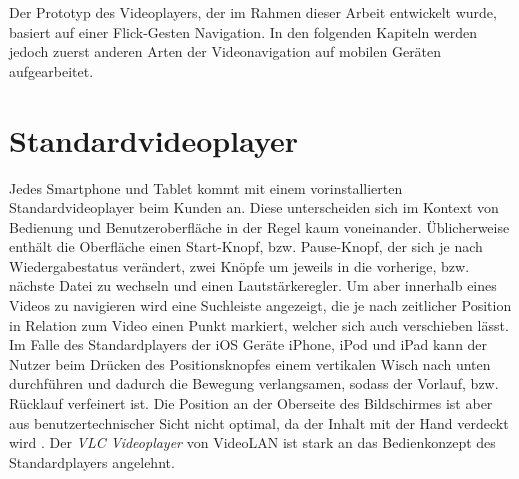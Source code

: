 \documentclass[11pt,a4paper]{report}
\begin{document}
Der Prototyp des Videoplayers, der im Rahmen dieser Arbeit entwickelt wurde, basiert auf einer Flick-Gesten Navigation. In den folgenden Kapiteln werden jedoch zuerst anderen Arten der Videonavigation auf mobilen Geräten aufgearbeitet.

\section{Standardvideoplayer}

Jedes Smartphone und Tablet kommt mit einem vorinstallierten Standardvideoplayer beim Kunden an. Diese unterscheiden sich im Kontext von Bedienung und Benutzeroberfläche in der Regel kaum voneinander. Üblicherweise enthält die Oberfläche einen Start-Knopf, bzw. Pause-Knopf, der sich je nach Wiedergabestatus verändert, zwei Knöpfe um jeweils in die vorherige, bzw. nächste Datei zu wechseln und einen Lautstärkeregler. Um aber innerhalb eines Videos zu navigieren wird eine Suchleiste angezeigt, die je nach zeitlicher Position in Relation zum Video einen Punkt markiert, welcher sich auch verschieben lässt. Im Falle des Standardplayers der iOS Geräte iPhone, iPod und iPad kann der Nutzer beim Drücken des Positionsknopfes einem vertikalen Wisch nach unten durchführen und dadurch die Bewegung verlangsamen, sodass der Vorlauf, bzw. Rücklauf verfeinert ist. Die Position an der Oberseite des Bildschirmes ist aber aus benutzertechnischer Sicht nicht optimal, da der Inhalt mit der Hand verdeckt wird \cite{huber2010toward}. Der \emph{VLC Videoplayer} von VideoLAN ist stark an das Bedienkonzept des Standardplayers angelehnt.
\end{document}
